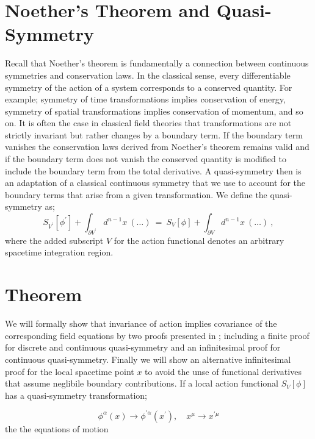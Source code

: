 \documentclass{article}
\begin{document}
\section{Noether's Theorem and Quasi-Symmetry}
Recall that Noether's theorem is fundamentally a connection between continuous symmetries and conservation laws.
In the classical sense, every differentiable symmetry of the action of a system corresponds to a conserved quantity.
For example; symmetry of time transformations implies conservation of energy, symmetry of spatial transformations implies conservation of momentum, and so on.
It is often the case in classical field theories that transformations are not strictly invariant but rather changes by a boundary term.
If the boundary term vanishes the conservation laws derived from Noether's theorem remains valid and if the boundary term does not vanish the conserved quantity is modified to include the boundary term from the total derivative.
A quasi-symmetry then is an adaptation of a classical continuous symmetry that we use to account for the boundary terms that arise from a given transformation. We define the quasi-symmetry as;
\begin{equation}
	S_{V^{\prime}}[\phi^{\prime}]
+\int_{\partial V^{\prime}} \!d^{n-1}x~(\ldots)
~=~S_V[\phi]+ \int_{\partial V} \!d^{n-1}x~(\ldots)\ ,
\end{equation}
where the added subscript $V$ for the action functional denotes an arbitrary spacetime integration region.

\section{Theorem}
We will formally show that invariance of action implies covariance of the corresponding field equations by two proofs presented in \cite{144417}; including a finite proof for discrete and continuous quasi-symmetry and an infinitesimal proof for continuous quasi-symmetry. Finally we will show an alternative infinitesimal proof for the local spacetime point $x$ to avoid the unse of functional derivatives that assume neglibile boundary contributions. If a local action functional $S_V\left[\phi\right]$ has a quasi-symmetry transformation;

\begin{equation}
	\phi^\alpha(x) \rightarrow \phi^{\prime \alpha}(x^\prime), \quad x^\mu \rightarrow x^{\prime \mu}
\end{equation}
the the equations of motion
\end{document}
